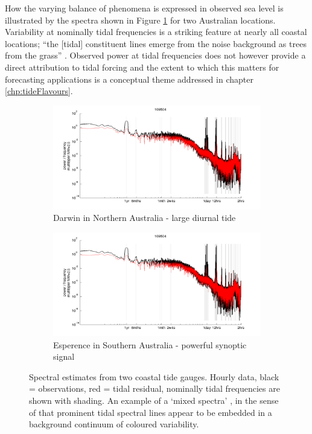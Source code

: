 How the varying balance of phenomena is expressed in observed sea level is illustrated by the spectra shown in Figure \ref{fig:obsSpectraEg} for two Australian locations.   Variability at nominally tidal frequencies is a striking feature at nearly all coastal locations;  ``the [tidal] constituent lines emerge from the noise background as trees from the grass'' \cite{godin:1972}.
Observed power at tidal frequencies does not however provide a direct attribution to tidal forcing and the extent to which this matters for forecasting applications is a conceptual theme addressed in chapter \ref{chp:tideFlavours}.
\begin{figure}[H]\centering
    \begin{subfigure}[b]{\figwidthFull}
        \includegraphics[trim={0 0 0 1cm},clip,width=\textwidth]{figures/plots/plot_109504.png} 
        \caption{Darwin in Northern Australia - large diurnal tide}
    \end{subfigure}
    
    \begin{subfigure}[b]{\figwidthFull}
        \includegraphics[trim={0 0 0 1cm},clip,width=\textwidth]{figures/plots/plot_109504.png} 
        \caption{Esperence in Southern Australia - powerful synoptic signal}
    \end{subfigure}
    \caption{Spectral estimates from two coastal tide gauges. Hourly data, black = observations, red = tidal residual, nominally tidal frequencies are shown with shading. An example of a `mixed spectra' \citep{Percival:1998tw}, in the sense of that prominent tidal spectral lines appear to be embedded in a background continuum of coloured variability.}
    \label{fig:obsSpectraEg}
\end{figure}   

